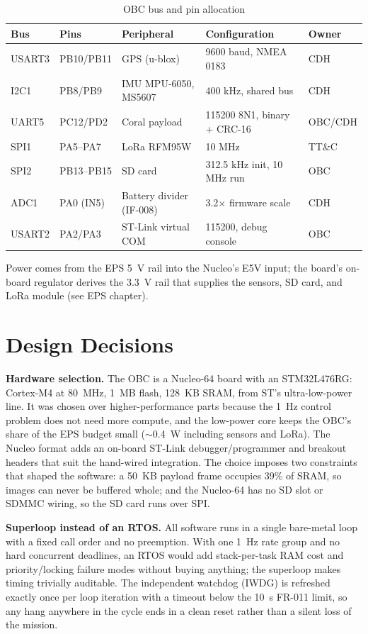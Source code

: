\begin{table}[H]
\centering
\begin{tabular}{lllll}
\toprule
\textbf{Bus} & \textbf{Pins} & \textbf{Peripheral} & \textbf{Configuration} & \textbf{Owner} \\
\midrule
USART3 & PB10/PB11 & GPS (u-blox)          & 9600 baud, NMEA 0183      & CDH \\
I2C1   & PB8/PB9   & IMU MPU-6050, MS5607  & 400 kHz, shared bus       & CDH \\
UART5  & PC12/PD2  & Coral payload         & 115200 8N1, binary + CRC-16 & OBC/CDH \\
SPI1   & PA5--PA7  & LoRa RFM95W           & 10 MHz                    & TT\&C \\
SPI2   & PB13--PB15 & SD card              & 312.5 kHz init, 10 MHz run & OBC \\
ADC1   & PA0 (IN5) & Battery divider (IF-008) & 3.2$\times$ firmware scale & CDH \\
USART2 & PA2/PA3   & ST-Link virtual COM   & 115200, debug console     & OBC \\
\bottomrule
\end{tabular}
\caption{OBC bus and pin allocation}
\label{tab:obc-buses}
\end{table}

Power comes from the EPS 5~V rail into the Nucleo's E5V input; the board's
on-board regulator derives the 3.3~V rail that supplies the sensors, SD
card, and LoRa module (see EPS chapter).

\section{Design Decisions}

\textbf{Hardware selection.} The OBC is a Nucleo-64 board with an
STM32L476RG: Cortex-M4 at 80~MHz, 1~MB flash, 128~KB SRAM, from ST's
ultra-low-power line. It was chosen over higher-performance parts because
the 1~Hz control problem does not need more compute, and the low-power
core keeps the OBC's share of the EPS budget small ($\sim$0.4~W including
sensors and LoRa). The Nucleo format adds an on-board ST-Link
debugger/programmer and breakout headers that suit the hand-wired
integration. The choice imposes two constraints that shaped the software:
a 50~KB payload frame occupies 39\% of SRAM, so images can never be
buffered whole; and the Nucleo-64 has no SD slot or SDMMC wiring, so the
SD card runs over SPI.

\textbf{Superloop instead of an RTOS.} All software runs in a single
bare-metal loop with a fixed call order and no preemption. With one
1~Hz rate group and no hard concurrent deadlines, an RTOS would add
stack-per-task RAM cost and priority/locking failure modes without buying
anything; the superloop makes timing trivially auditable. The independent
watchdog (IWDG) is refreshed exactly once per loop iteration with a
timeout below the 10~s FR-011 limit, so any hang anywhere in the cycle
ends in a clean reset rather than a silent loss of the mission.

